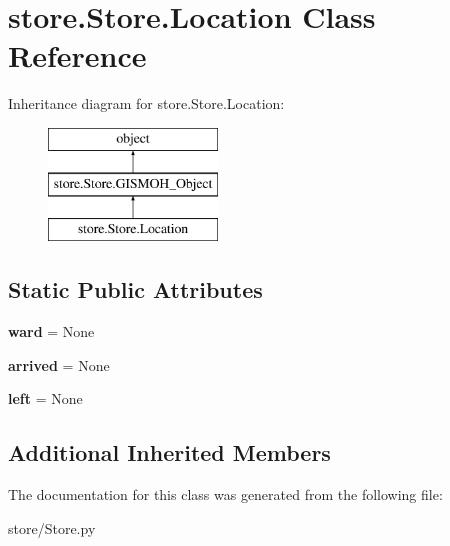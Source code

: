 \hypertarget{classstore_1_1_store_1_1_location}{\section{store.\-Store.\-Location Class Reference}
\label{classstore_1_1_store_1_1_location}
}
Inheritance diagram for store.\-Store.\-Location\-:\begin{figure}[H]
\begin{center}
\leavevmode
\includegraphics[height=3.000000cm]{classstore_1_1_store_1_1_location}
\end{center}
\end{figure}
\subsection*{Static Public Attributes}
\begin{DoxyCompactItemize}
\item 
\hypertarget{classstore_1_1_store_1_1_location_a4f7384df1dac7954a4b47ddb5f73e547}{{\bfseries ward} = None}\label{classstore_1_1_store_1_1_location_a4f7384df1dac7954a4b47ddb5f73e547}

\item 
\hypertarget{classstore_1_1_store_1_1_location_ae81364ac93cb4db0b016c3d514439e00}{{\bfseries arrived} = None}\label{classstore_1_1_store_1_1_location_ae81364ac93cb4db0b016c3d514439e00}

\item 
\hypertarget{classstore_1_1_store_1_1_location_a8faaea31d4b72ea58051f323ccee5937}{{\bfseries left} = None}\label{classstore_1_1_store_1_1_location_a8faaea31d4b72ea58051f323ccee5937}

\end{DoxyCompactItemize}
\subsection*{Additional Inherited Members}


The documentation for this class was generated from the following file\-:\begin{DoxyCompactItemize}
\item 
store/Store.\-py\end{DoxyCompactItemize}

